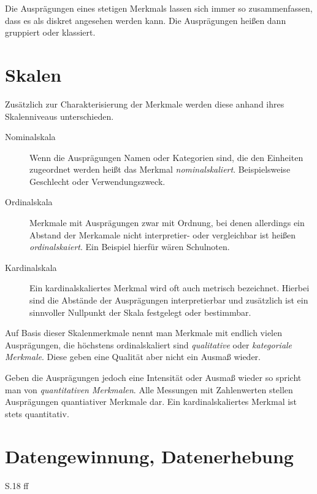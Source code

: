 Die Ausprägungen eines stetigen Merkmals lassen sich immer so zusammenfassen, dass es als diskret angesehen werden kann. Die Ausprägungen heißen dann gruppiert oder klassiert.



\section{Skalen}
Zusätzlich zur Charakterisierung der Merkmale werden diese anhand ihres Skalenniveaus unterschieden.
\begin{description}
	\item[Nominalskala]
		Wenn die Ausprägungen Namen oder Kategorien sind, die den Einheiten zugeordnet werden heißt das Merkmal \emph{nominalskaliert}. Beispielsweise Geschlecht oder Verwendungszweck.
	\item[Ordinalskala]
		Merkmale mit Ausprägungen zwar mit Ordnung, bei denen allerdings ein Abstand der Merkamale nicht interpretier- oder vergleichbar ist heißen \emph{ordinalskaiert}. Ein Beispiel hierfür wären Schulnoten.
	\item[Kardinalskala]
		Ein kardinalskaliertes Merkmal wird oft auch metrisch bezeichnet. Hierbei sind die Abstände der Ausprägungen interpretierbar und zusätzlich ist ein sinnvoller Nullpunkt der Skala festgelegt oder bestimmbar.
\end{description}

Auf Basis dieser Skalenmerkmale nennt man Merkmale mit endlich vielen Ausprägungen, die höchstens ordinalskaliert sind \emph{qualitative} oder \emph{kategoriale Merkmale}. Diese geben eine Qualität aber nicht ein Ausmaß wieder. 

Geben die Ausprägungen jedoch eine Intensität oder Ausmaß wieder so spricht man von \emph{quantitativen Merkmalen}. Alle Messungen mit Zahlenwerten stellen Ausprägungen quantiativer Merkmale dar. Ein kardinalskaliertes Merkmal ist stets quantitativ.

\section{Datengewinnung, Datenerhebung}
S.18 ff


